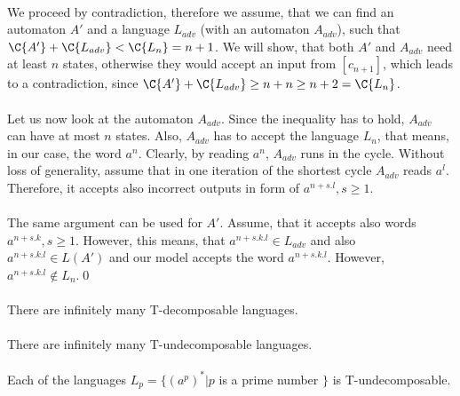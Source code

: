 \paragraph{}
We proceed by contradiction, therefore we assume, that we can find an automaton $A'$ and a language $L_{adv}$ (with an automaton $A_{adv}$), such that $\C{A'} + \C{L_{adv}} < \C{L_n} = n+1$. We will show, that both $A'$ and $A_{adv}$ need at least $n$ states, otherwise they would accept an input from $[c_{n+1}]$, which leads to a contradiction, since $\C{A'} + \C{L_{adv}} \geq n+n \geq n+2 = \C{L_n}$.

\paragraph{}
Let us now look at the automaton $A_{adv}$. Since the inequality has to hold, $A_{adv}$ can have at most $n$ states. Also, $A_{adv}$ has to accept the language $L_n$, that means, in our case, the word $a^n$. Clearly, by reading $a^n$, $A_{adv}$ runs in the cycle. Without loss of generality, assume that in one iteration of the shortest cycle $A_{adv}$ reads $a^l$. Therefore, it accepts also incorrect outputs in form of $a^{n + s.l}, s \geq 1$.

\paragraph{}
The same argument can be used for $A'$. Assume, that it accepts also words $a^{n + s.k}, s \geq 1$. However, this means, that $a^{n+s.k.l} \in L_{adv}$ and also $a^{n+s.k.l} \in L(A')$ and our model accepts the word $a^{n + s.k.l}$. However, $a^{n + s.k.l} \notin L_n$.\qed

\paragraph{}
\cdosledok There are infinitely many T-decomposable languages.

\paragraph{}
\cveta There are infinitely many T-undecomposable languages.

\paragraph{}
\dokaz Each of the languages $L_{p} = \{ (a^p)^* | p$ is a prime number $\}$ is T-undecomposable.

